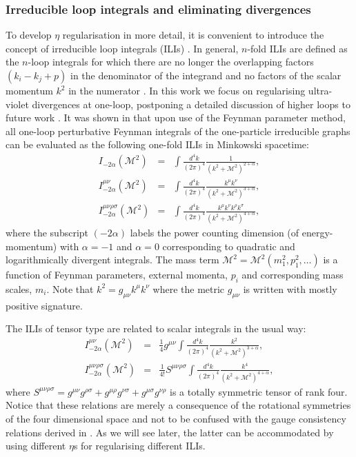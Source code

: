 \documentclass[11pt, letter]{article}
\newcommand{\M}{\mathcal{M}}
\begin{document}
\subsubsection{Irreducible loop integrals and eliminating divergences} \label{sec:ilis}
To develop $\eta$ regularisation in more detail, it is convenient to introduce the concept of irreducible loop integrals (ILIs) \citep{Wu03,Wu04,Wu14}. In general, $n$-fold ILIs are defined as the $n$-loop integrals for which there are no longer the overlapping factors $(k_i - k_j + p)$ in the denominator of the integrand and no factors of the scalar momentum  $k^2$ in the numerator \cite{Wu14}.  In this work we  focus on regularising ultra-violet divergences at one-loop, postponing a detailed discussion of higher loops to future work \citep{PadillaSmith23}.  It was shown in \cite{Wu03} that upon use of the Feynman parameter method, all one-loop perturbative Feynman integrals of the one-particle irreducible graphs can be evaluated as the following one-fold ILIs in Minkowski spacetime:
\begin{eqnarray}
I_{-2\alpha} (\M^2)&=& \int \frac{d^4 k}{(2 \pi)^4} \frac{1}{(k^2 +\M^2)^{2 + \alpha}}, \label{ILIs1} \\ 
I_{-2 \alpha}^{ \mu \nu} (\M^2) &=& \int \frac{d^4 k}{(2 \pi)^4}  \frac{k^{\mu}k^{\nu}}{(k^2 +\M^2)^{3+\alpha}}, \label{ILIs2} \\ 
I_{-2 \alpha}^{\mu \nu \rho \sigma} (\M^2) &=& \int \frac{d^4 k}{(2 \pi)^4}  \frac{k^{\mu}k^{\nu}k^{\rho}k^{\sigma}}{(k^2 +\M^2)^{4+\alpha}}, \label{ILIs3}
\end{eqnarray}
where the subscript $(-2\alpha)$ labels the power counting dimension (of energy-momentum) with  $\alpha = -1$ and $\alpha = 0$ corresponding  to quadratic and logarithmically divergent integrals.  The mass term  $\M^2 =\M^2(m^2_1, p_1^2, \dots) $ is a function of Feynman parameters, external momenta, $p_i$ and corresponding mass scales, $m_i$.  Note that $k^2=g_{\mu\nu} k^\mu k^\nu$ where the metric $g_{\mu\nu}$ is written with mostly positive signature. 

The ILIs of tensor type are related to scalar integrals in the usual way:
\begin{eqnarray}
I_{-2 \alpha}^{ \mu \nu} (\M^2) &=&\frac14 g^{\mu\nu} \int \frac{d^4 k}{(2 \pi)^4}  \frac{k^2}{(k^2 +\M^2)^{3+\alpha}}, \label{ILIs2scal} \\ 
I_{-2 \alpha}^{\mu \nu \rho \sigma} (\M^2) &=& \frac{1}{4!} S^{\mu\nu \rho\sigma}  \int \frac{d^4 k}{(2 \pi)^4}  \frac{k^4}{(k^2 +\M^2)^{4+\alpha}}, \label{ILIs3scal}
\end{eqnarray}
where $S^{\mu\nu\rho\sigma}=g^{\mu\nu}g^{\rho\sigma}+g^{\mu\rho}g^{\nu\sigma}+g^{\mu\sigma}g^{\nu\rho}$ is a totally symmetric tensor of rank four. 
Notice that these relations are merely  a consequence of  the rotational  symmetries of the  four dimensional space and not to be confused with the gauge consistency relations derived in \citep{Wu03,Wu04,Wu14}. As we will see later,  the latter can be accommodated by using different $\eta$s for regularising different ILIs. 
\end{document}
